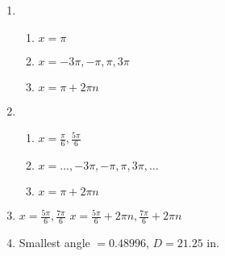 \documentclass{article}
\begin{document}
\begin{enumerate}
\item

	\begin{enumerate}
	
	\item $x = \pi$
	
	\item $x = -3\pi, -\pi, \pi, 3\pi$
	
	\item $x = \pi + 2\pi n$
	
	\end{enumerate}
	
\item

	\begin{enumerate}
	
	\item $x = \frac{\pi}{6}, \frac{5\pi}{6}$
	
	\item $x = ..., -3\pi, -\pi, \pi, 3\pi, ...$
	
	\item $x = \pi + 2\pi n$
	
	\end{enumerate}
	
\item $x = \frac{5\pi}{6}, \frac{7\pi}{6}$ \newline
$x = \frac{5\pi}{6} + 2\pi n, \frac{7\pi}{6} + 2\pi n$

\item Smallest angle $= 0.48996$, $D = 21.25$ in.

\end{enumerate}
\end{document}
